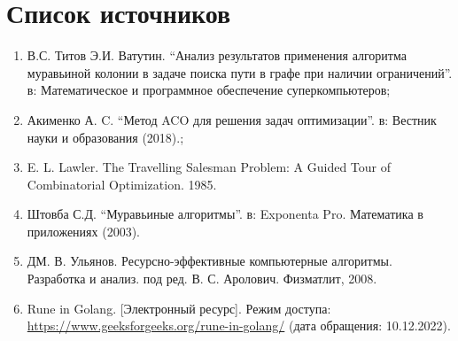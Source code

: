 %



\section*{\large Список источников}
\begin{enumerate}
	\item В.С. Титов Э.И. Ватутин. “Анализ результатов применения алгоритма муравьиной колонии в задаче поиска пути в графе при наличии ограничений”. в: Математическое и программное обеспечение суперкомпьютеров; \label{bib:1}
	\item Акименко А. C. “Метод ACO для решения задач оптимизации”. в: Вестник науки и образования (2018).; \label{bib:2}
	\item E. L. Lawler. The Travelling Salesman Problem: A Guided Tour of Combinatorial Optimization. 1985. \label{bib:3}
	\item Штовба С.Д. “Муравьиные алгоритмы”. в: Exponenta Pro. Математика в приложениях (2003).\label{bib:4}
	\item ДМ. В. Ульянов. Ресурсно-эффективные компьютерные алгоритмы. Разработка и анализ. под ред. В. С. Аролович. Физматлит, 2008. \label{bib:5}
	\item Rune in Golang. [Электронный ресурс]. Режим доступа: \url{https://www.geeksforgeeks.org/rune-in-golang/} (дата обращения: 10.12.2022). \label{bib:7}
\end{enumerate}